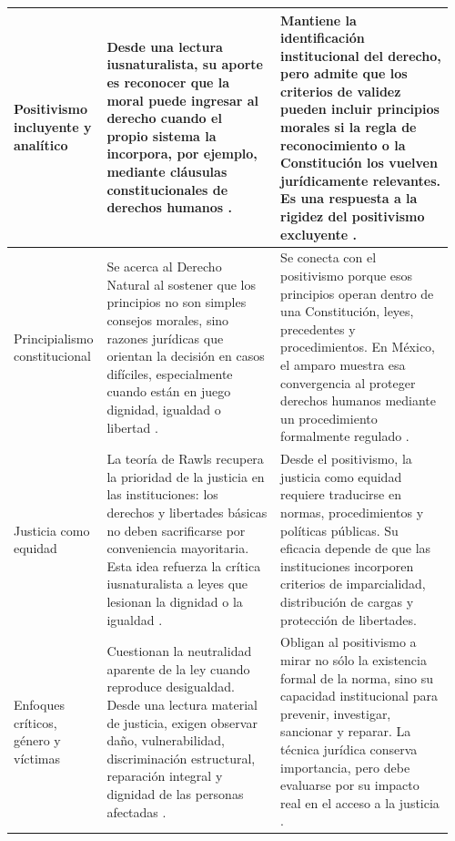 \documentclass[
	spanish, %
	letterpaper, oneside
]{article}
\begin{document}
\begin{landscape}
\begin{longtable}{@{}p{0.18\linewidth}p{0.39\linewidth}p{0.39\linewidth}@{}}
Positivismo incluyente y analítico &
Desde una lectura iusnaturalista, su aporte es reconocer que la moral puede ingresar al derecho cuando el propio sistema la incorpora, por ejemplo, mediante cláusulas constitucionales de derechos humanos \citep{rojas-gonzalezFilosofiaDerecho2018}. &
Mantiene la identificación institucional del derecho, pero admite que los criterios de validez pueden incluir principios morales si la regla de reconocimiento o la Constitución los vuelven jurídicamente relevantes. Es una respuesta a la rigidez del positivismo excluyente \citep{rojas-gonzalezFilosofiaDerecho2018}. \\
\midrule

Principialismo constitucional &
Se acerca al Derecho Natural al sostener que los principios no son simples consejos morales, sino razones jurídicas que orientan la decisión en casos difíciles, especialmente cuando están en juego dignidad, igualdad o libertad \citep{rojas-gonzalezFilosofiaDerecho2018}. &
Se conecta con el positivismo porque esos principios operan dentro de una Constitución, leyes, precedentes y procedimientos. En México, el amparo muestra esa convergencia al proteger derechos humanos mediante un procedimiento formalmente regulado \citep{LeyAmparoReglamentaria}. \\
\midrule

Justicia como equidad &
La teoría de Rawls recupera la prioridad de la justicia en las instituciones: los derechos y libertades básicas no deben sacrificarse por conveniencia mayoritaria. Esta idea refuerza la crítica iusnaturalista a leyes que lesionan la dignidad o la igualdad \citep{ruizrodriguezFilosofiaDerecho2009}. &
Desde el positivismo, la justicia como equidad requiere traducirse en normas, procedimientos y políticas públicas. Su eficacia depende de que las instituciones incorporen criterios de imparcialidad, distribución de cargas y protección de libertades. \\
\midrule

Enfoques críticos, género y víctimas &
Cuestionan la neutralidad aparente de la ley cuando reproduce desigualdad. Desde una lectura material de justicia, exigen observar daño, vulnerabilidad, discriminación estructural, reparación integral y dignidad de las personas afectadas \citep{LeyGeneralVictimas,franzoniacevedoLeyGeneralAcceso2017}. &
Obligan al positivismo a mirar no sólo la existencia formal de la norma, sino su capacidad institucional para prevenir, investigar, sancionar y reparar. La técnica jurídica conserva importancia, pero debe evaluarse por su impacto real en el acceso a la justicia \citep{LeyGeneralVictimas}. \\

\end{longtable}
\endgroup
\end{landscape}
\pagestyle{fancy}
\end{document}
